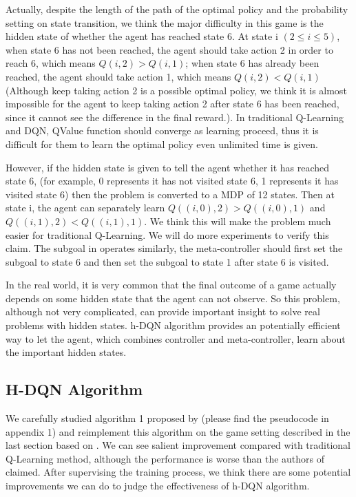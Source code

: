 \documentclass{article}
\begin{document}
\begin{spacing}{1.1}
    Actually, despite the length of the path of the optimal policy and the probability setting on state transition, we think the major difficulty in this game is the hidden state of whether the agent has reached state 6. At state i $(2\leq i\leq 5)$, when state 6 has not been reached, the agent should take action 2 in order to reach 6, which means $Q(i, 2) > Q(i, 1)$; when state 6 has already been reached, the agent should take action 1, which means $Q(i, 2) < Q(i, 1)$ (Although keep taking action 2 is a possible optimal policy, we think it is almost impossible for the agent to keep taking action 2 after state 6 has been reached, since it cannot see the difference in the final reward.). In traditional Q-Learning and DQN, QValue function should converge as learning proceed, thus it is difficult for them to learn the optimal policy even unlimited time is given.

    However, if the hidden state is given to tell the agent whether it has reached state 6, (for example, 0 represents it has not visited state 6, 1 represents it has visited state 6) then the problem is converted to a MDP of 12 states. Then at state i, the agent can separately learn $Q((i, 0), 2) > Q((i, 0), 1)$ and $Q((i, 1), 2) < Q((i, 1), 1)$. We think this will make the problem much easier for traditional Q-Learning. We will do more experiments to verify this claim. The subgoal in \cite{AI-16} operates similarly, the meta-controller should first set the subgoal to state 6 and then set the subgoal to state 1 after state 6 is visited.

    In the real world, it is very common that the final outcome of a game actually depends on some hidden state that the agent can not observe. So this problem, although not very complicated, can provide important insight to solve real problems with hidden states. h-DQN algorithm provides an potentially efficient way to let the agent, which combines controller and meta-controller, learn about the important hidden states.
    \subsection{H-DQN Algorithm}
    We carefully studied algorithm 1 proposed by \cite{AI-16} (please find the pseudocode in appendix 1) and reimplement this algorithm on the game setting described in the last section based on \cite{github}. We can see salient improvement compared with traditional Q-Learning method, although the performance is worse than the authors of \cite{AI-16} claimed. After supervising the training process, we think there are some potential improvements we can do to judge the effectiveness of h-DQN algorithm.


\end{spacing}
\end{document}
